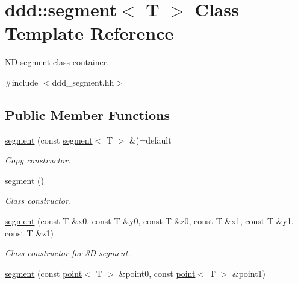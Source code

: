 \hypertarget{classddd_1_1segment}{}\section{ddd\+:\+:segment$<$ T $>$ Class Template Reference}
\label{classddd_1_1segment}


ND segment class container.  




{\ttfamily \#include $<$ddd\+\_\+segment.\+hh$>$}

\subsection*{Public Member Functions}
\begin{DoxyCompactItemize}
\item 
\mbox{\label{classddd_1_1segment_ad6ed63172c53846edce9a982ea54f734}} 
\hyperlink{classddd_1_1segment_ad6ed63172c53846edce9a982ea54f734}{segment} (const \hyperlink{classddd_1_1segment}{segment}$<$ T $>$ \&)=default
\begin{DoxyCompactList}\small\item\em Copy constructor. \end{DoxyCompactList}\item 
\mbox{\label{classddd_1_1segment_a11949f0ad3906498f0625230b5a04fa7}} 
\hyperlink{classddd_1_1segment_a11949f0ad3906498f0625230b5a04fa7}{segment} ()
\begin{DoxyCompactList}\small\item\em Class constructor. \end{DoxyCompactList}\item 
\mbox{\label{classddd_1_1segment_a4a0a5e0d31877978f3f3652fa3097162}} 
\hyperlink{classddd_1_1segment_a4a0a5e0d31877978f3f3652fa3097162}{segment} (const T \&x0, const T \&y0, const T \&z0, const T \&x1, const T \&y1, const T \&z1)
\begin{DoxyCompactList}\small\item\em Class constructor for 3D segment. \end{DoxyCompactList}\item 
\hyperlink{classddd_1_1segment_afdfcc983efc30b3dee0af2603795775b}{segment} (const \hyperlink{classddd_1_1point}{point}$<$ T $>$ \&point0, const \hyperlink{classddd_1_1point}{point}$<$ T $>$ \&point1)

\end{DoxyCompactItemize}
